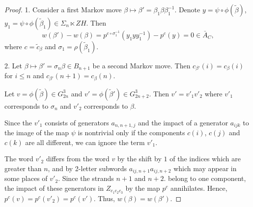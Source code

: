 \documentclass[10pt,a4paper]{amsart}
\begin{document}
\begin{proof}
    1. Consider a first Markov move $\beta\mapsto\beta'=\beta_1\beta\beta_1^{-1}$. Denote $y=\psi\circ\phi(\tilde\beta)$, $y_1=\psi\circ\phi(\tilde\beta_1)\in\Sigma_n\ltimes ZH$. Then
\[
w(\beta')-w(\beta)=p^{c\circ\sigma_1^{-1}}(y_1yy_1^{-1})-p^c(y)=0\in\bar A_C,    
\]
where $c=\tilde c_\beta$ and $\sigma_1=\rho(\tilde\beta_1)$.

2. Let $\beta\mapsto \beta'=\sigma_n\beta\in B_{n+1}$ be a second Markov move. Then $c_{\beta'}(i)=c_\beta(i)$ for $i\le n$ and $c_{\beta'}(n+1)=c_\beta(n)$.

Let $v=\phi(\tilde\beta)\in G^3_{2n}$ and $v'=\phi(\tilde\beta')\in G^3_{2n+2}$. Then $v'=v'_1v'_2$ where $v'_1$ corresponds to $\sigma_n$ and $v'_2$ corresponds to $\beta$.

Since the $v'_1$ consists of generators $a_{n,n+1,j}$ and the impact of a generator $a_{ijk}$ to the image of the map $\psi$ is nontrivial only if the components $c(i)$, $c(j)$ and $c(k)$ are all different, we can ignore the term $v'_1$.

The word $v'_2$ differs from the word $v$ by the shift by $1$ of the indices which are greater than $n$, and by 2-letter subwords $a_{ij,n+1}a_{ij,n+2}$ which may appear in some places of $v'_2$. Since the strands $n+1$ and $n+2$. belong to one component, the impact of these generators in $Z_{c_1c_2c_3}$ by the map $p^c$ annihilates. Hence, $p^c(v)=p^c(v'_2)=p^c(v')$.
Thus, $w(\beta)=w(\beta')$.
\end{proof}
\end{document}
